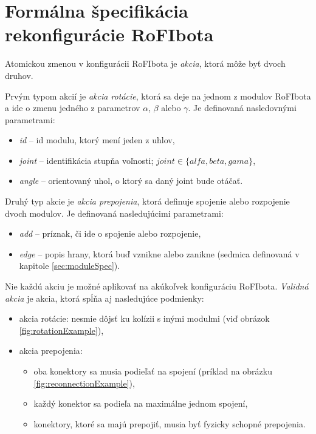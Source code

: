 \documentclass[
  digital, %
  oneside, %
  table,   %
  lof,     %
  nolot,     %
]{fithesis3}
\begin{document}
\section{Formálna špecifikácia rekonfigurácie RoFIbota}
\label{sec:formalRecfg}
Atomickou zmenou v konfigurácii RoFIbota je \textit{akcia}, ktorá môže byť dvoch druhov. 

Prvým typom akcií je \textit{akcia rotácie}, ktorá sa deje na jednom z modulov RoFIbota a ide o zmenu jedného z parametrov $\alpha$, $\beta$ alebo $\gamma$. Je definovaná nasledovnými parametrami: 
\begin{itemize}
    \item \textit{id} -- id modulu, ktorý mení jeden z uhlov, 
    \item \textit{joint} -- identifikácia stupňa voľnosti; $joint \in \{alfa, beta, gama\}$, 
    \item \textit{angle} -- orientovaný uhol, o ktorý sa daný joint bude otáčať. 
\end{itemize}

Druhý typ akcie je \textit{akcia prepojenia}, ktorá definuje spojenie alebo rozpojenie dvoch modulov. Je definovaná nasledujúcimi parametrami: 
\begin{itemize}
    \item \textit{add} -- príznak, či ide o spojenie alebo rozpojenie,
    \item \textit{edge} -- popis hrany, ktorá buď vznikne alebo zanikne (sedmica definovaná v kapitole \ref{sec:moduleSpec}). 
\end{itemize}

Nie každú akciu je možné aplikovať na akúkoľvek konfiguráciu RoFIbota. \textit{Validná akcia} je akcia, ktorá spĺňa aj nasledujúce podmienky:
\begin{itemize}
    \item akcia rotácie: nesmie dôjsť ku kolízii s inými modulmi (viď obrázok \ref{fig:rotationExample}), 
    \item akcia prepojenia: 
    \begin{itemize}[topsep=-5pt]
        \item oba konektory sa musia podieľať na spojení (príklad na obrázku \ref{fig:reconnectionExample}), 
        \item každý konektor sa podieľa na maximálne jednom spojení,
        \item konektory, ktoré sa majú prepojiť, musia byť fyzicky schopné prepojenia.
    \end{itemize}
\end{itemize}
\end{document}
